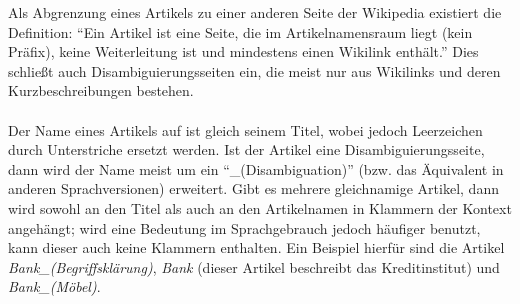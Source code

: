 Als Abgrenzung eines Artikels zu einer anderen Seite der Wikipedia existiert die Definition:
"`Ein Artikel ist eine Seite, die im Artikelnamensraum liegt (kein Präfix), keine Weiterleitung ist und mindestens einen Wikilink enthält."'\footnotemark{}
Dies schließt auch Disambiguierungsseiten ein, die meist nur aus Wikilinks und deren Kurzbeschreibungen bestehen.
\paragraph{} 
Der Name eines Artikels auf ist gleich seinem Titel, wobei jedoch Leerzeichen durch Unterstriche ersetzt werden.
Ist der Artikel eine Disambiguierungsseite, dann wird der Name meist um ein "`\_(Disambiguation)"' (bzw. das Äquivalent in anderen Sprachversionen) erweitert.
Gibt es mehrere gleichnamige Artikel, dann wird sowohl an den Titel als auch an den Artikelnamen in Klammern der Kontext angehängt; wird eine Bedeutung im Sprachgebrauch jedoch häufiger benutzt,
kann dieser auch keine Klammern enthalten.
Ein Beispiel hierfür sind die Artikel \emph{Bank\_(Begriffsklärung)}, \emph{Bank} (dieser Artikel beschreibt das Kreditinstitut) und \emph{Bank\_(Möbel)}.

